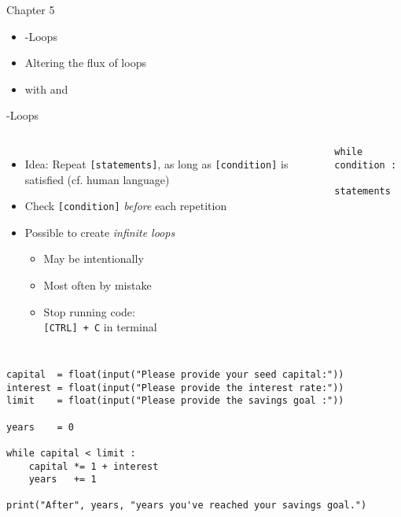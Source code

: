 
\begin{frame}[fragile]{Chapter 5}
%
\begin{itemize}
\item {}-Loops
\item Altering the flux of loops
\item {} with  and 
\end{itemize}
%
\end{frame}


\begin{frame}[fragile]{-Loops}
%
\begin{columns}[T]
\begin{itemize}
\item Idea: Repeat \texttt{[statements]}, as long as \texttt{[condition]} is satisfied (cf. human language)
\item Check \texttt{[condition]} \emph{before} each repetition
\item Possible to create \emph{infinite loops}
	\begin{itemize}
	\item May be intentionally
	\item Most often by mistake
	\item Stop running code:\\
		\texttt{[CTRL] + C} in terminal
	\end{itemize}
\end{itemize}
%
\begin{codebox}
\begin{verbatim}
while condition :
    statements
\end{verbatim}
\end{codebox}
\end{columns}
%
\end{frame}


\begin{frame}[fragile]
%
\begin{codebox}
\begin{verbatim}
capital  = float(input("Please provide your seed capital:"))
interest = float(input("Please provide the interest rate:"))
limit    = float(input("Please provide the savings goal :"))

years    = 0

while capital < limit :
    capital *= 1 + interest
    years   += 1

print("After", years, "years you've reached your savings goal.")
\end{verbatim}
\end{codebox}
%
\end{frame}


